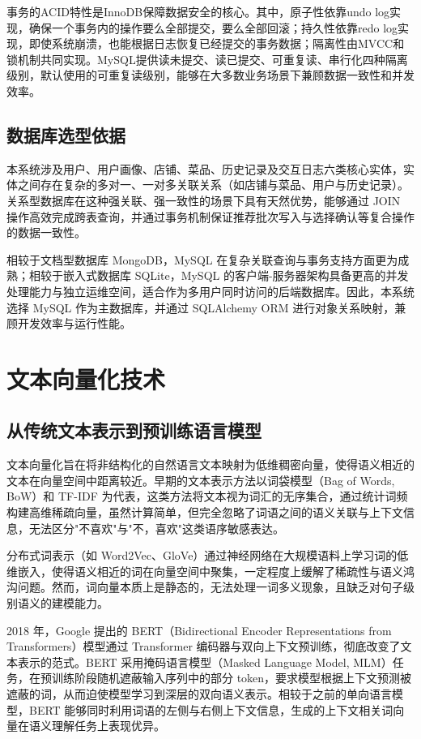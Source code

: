 事务的ACID特性是InnoDB保障数据安全的核心。其中，原子性依靠undo log实现，确保一个事务内的操作要么全部提交，要么全部回滚；持久性依靠redo log实现，即使系统崩溃，也能根据日志恢复已经提交的事务数据；隔离性由MVCC和锁机制共同实现。MySQL提供读未提交、读已提交、可重复读、串行化四种隔离级别，默认使用的可重复读级别，能够在大多数业务场景下兼顾数据一致性和并发效率。


\subsection{数据库选型依据}

本系统涉及用户、用户画像、店铺、菜品、历史记录及交互日志六类核心实体，实体之间存在复杂的多对一、一对多关联关系（如店铺与菜品、用户与历史记录）。关系型数据库在这种强关联、强一致性的场景下具有天然优势，能够通过 JOIN 操作高效完成跨表查询，并通过事务机制保证推荐批次写入与选择确认等复合操作的数据一致性。

相较于文档型数据库 MongoDB，MySQL 在复杂关联查询与事务支持方面更为成熟；相较于嵌入式数据库 SQLite，MySQL 的客户端-服务器架构具备更高的并发处理能力与独立运维空间，适合作为多用户同时访问的后端数据库。因此，本系统选择 MySQL 作为主数据库，并通过 SQLAlchemy ORM 进行对象关系映射，兼顾开发效率与运行性能。

\section{文本向量化技术}

\subsection{从传统文本表示到预训练语言模型}

文本向量化旨在将非结构化的自然语言文本映射为低维稠密向量，使得语义相近的文本在向量空间中距离较近。早期的文本表示方法以词袋模型（Bag of Words, BoW）和 TF-IDF 为代表，这类方法将文本视为词汇的无序集合，通过统计词频构建高维稀疏向量，虽然计算简单，但完全忽略了词语之间的语义关联与上下文信息，无法区分"不喜欢"与"不，喜欢"这类语序敏感表达。

分布式词表示（如 Word2Vec、GloVe）通过神经网络在大规模语料上学习词的低维嵌入，使得语义相近的词在向量空间中聚集，一定程度上缓解了稀疏性与语义鸿沟问题。然而，词向量本质上是静态的，无法处理一词多义现象，且缺乏对句子级别语义的建模能力。

2018 年，Google 提出的 BERT（Bidirectional Encoder Representations from Transformers）模型通过 Transformer 编码器与双向上下文预训练\super{[21]}，彻底改变了文本表示的范式。BERT 采用掩码语言模型（Masked Language Model, MLM）任务，在预训练阶段随机遮蔽输入序列中的部分 token，要求模型根据上下文预测被遮蔽的词，从而迫使模型学习到深层的双向语义表示。相较于之前的单向语言模型，BERT 能够同时利用词语的左侧与右侧上下文信息，生成的上下文相关词向量在语义理解任务上表现优异。

